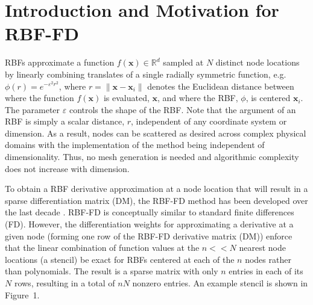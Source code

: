 \documentclass{sig-alternate}
\def\NOTE#1{{}}
\begin{document}
%
%

\section{Introduction and Motivation for RBF-FD}
\label{sec:rbf}

RBFs approximate a function $f(\mathbf{x}) \in \mathbb{R}^d$ sampled at $N$ distinct node locations by linearly combining translates of a single radially symmetric function, e.g. $\phi(r) = e^{-\varepsilon^2r^2}$, where $r=\|\mathbf{x}-\mathbf{x}_{i}\|$ denotes the Euclidean distance between where the function $f(\mathbf{x})$ is evaluated, $\mathbf{x}$, and where the RBF, $\phi$, is centered $\mathbf{x}_{i}$. The parameter $\varepsilon$ controls the shape of the RBF. Note that the argument of an RBF is simply a scalar distance, $r$, independent of any coordinate system or dimension. As a result, nodes can be scattered as desired across complex physical domains with the implementation of the method being independent of dimensionality. Thus, no mesh generation is needed and algorithmic complexity does not increase with dimension.
\NOTE{While reading that paragraph, I was under the impression that the physical domain needs to be a sphere.}

To obtain a RBF derivative approximation at a node location that will result in a sparse differentiation matrix (DM), the RBF-FD method has been developed over the last decade \cite{TAI1,TAI2,SDY02,WrFo06}. RBF-FD is conceptually similar to standard finite differences (FD). 
However, the differentiation weights for approximating a derivative at a given node (forming one row of the RBF-FD derivative matrix (DM)) enforce that the linear combination of function values at the $n << N$ nearest node locations (a stencil) be exact for RBFs centered at each of the $n$ nodes rather than polynomials. The result is a sparse matrix with only $n$ entries in each of its $N$ rows, resulting in a total of $nN$ nonzero entries. An example stencil is shown in 
Figure~1.
\end{document}
